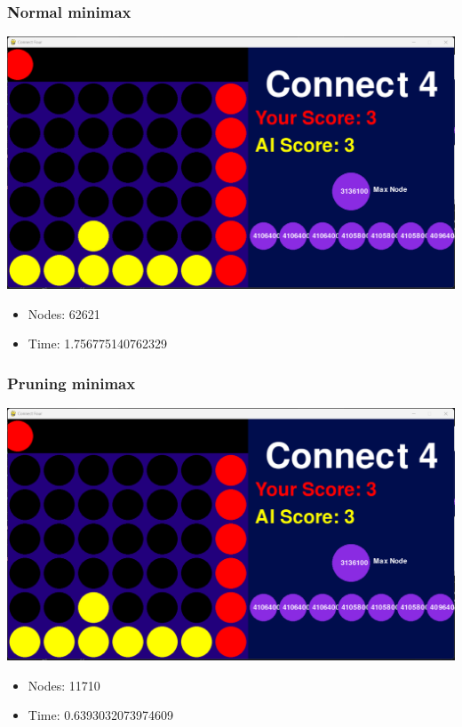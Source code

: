 \documentclass{article}
\begin{document}
\subsubsection*{Normal minimax}
\begin{center}
    \includegraphics[width=0.8\linewidth]{testcase5.png}
\end{center}
\begin{itemize}
    \item Nodes: 62621
    \item Time: 1.756775140762329
\end{itemize}
\subsubsection*{Pruning minimax}
\begin{center}
    \includegraphics[width=0.8\linewidth]{pruning4.png}
\end{center}
\begin{itemize}
    \item Nodes: 11710
    \item Time: 0.6393032073974609
\end{itemize}
\end{document}
